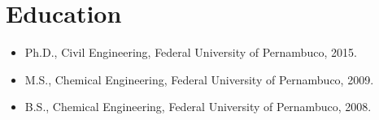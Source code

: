 % 
% 
% 

\else
  \section*{Education}

  \begin{itemize}
    \item Ph.D., Civil Engineering, Federal University of Pernambuco, 2015.
    \item M.S., Chemical Engineering,  Federal University of Pernambuco, 2009.
    \item B.S., Chemical Engineering,  Federal University of Pernambuco, 2008.
  \end{itemize}

% 


